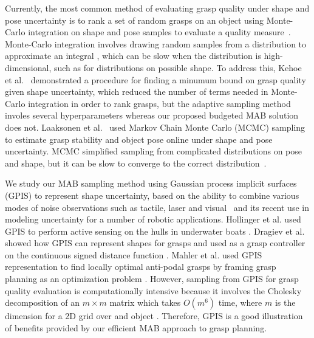 \documentclass[letterpaper, 10 pt, conference]{ieeeconf}  %
\begin{document}
Currently, the most common method of evaluating grasp quality under shape and pose uncertainty is to rank a set of random grasps on an object using Monte-Carlo integration on shape and pose samples to evaluate a quality measure~\cite{christopoulos2007handling, kehoe2012estimating, kehoe2012toward}.
Monte-Carlo integration involves drawing random samples from a distribution to approximate an integral \cite{caflisch1998monte}, which can be slow when the distribution is high-dimensional, such as for distributions on possible shape.
To address this, Kehoe et al.~\cite{kehoe2012estimating} demonstrated a procedure for finding a minumum bound on grasp quality given shape uncertainty, which reduced the number of terms needed in Monte-Carlo integration in order to rank grasps, but the adaptive sampling method involes several hyperparameters whereas our proposed budgeted MAB solution does not.
Laaksonen et al.~\cite{laaksonen2012probabilistic} used Markov Chain Monte Carlo (MCMC) sampling to estimate grasp stability and object pose online under shape and pose uncertainty.
MCMC simplified sampling from complicated distributions on pose and shape, but it can be slow to converge to the correct distribution~\cite{andrieu2003introduction}.

We study our MAB sampling method using Gaussian process implicit surfaces (GPIS) to represent shape uncertainty, based on the ability to combine various modes of noise observations such as tactile, laser and visual~\cite{rasmussen2006, williams2007, dragiev2011} and its recent use in modeling uncertainty for a number of robotic applications.
Hollinger et al. used GPIS to perform active sensing on the hulls in underwater boats \cite{hollinger2013}.
Dragiev et al. showed how GPIS can represent shapes for grasps and used  as a grasp controller on the continuous signed distance function \cite{dragiev2011}.
Mahler et al. used GPIS representation to find locally optimal anti-podal grasps by framing grasp planning as an optimization problem \cite{mahler2015opt}. 
However, sampling from GPIS for grasp quality evaluation is computationally intensive because it involves the Cholesky decomposition of an $m \times m$ matrix which takes $O(m^6)$ time, where $m$ is the dimension for a 2D grid over and object \cite{morrison1990multivariate}.
Therefore, GPIS is a good illustration of benefits provided by our efficient MAB approach to grasp planning.
\end{document}
